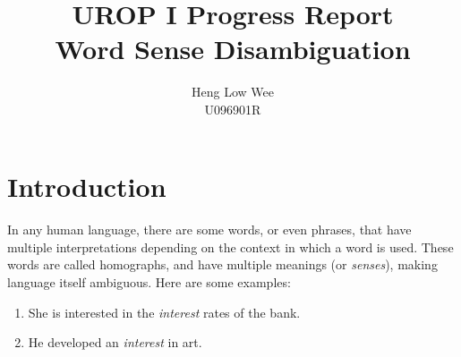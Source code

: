 \documentclass[12 pt]{article}
\begin{document}

\title{UROP I Progress Report \\ Word Sense Disambiguation}
\author{Heng Low Wee \\ U096901R}
\date{}
\maketitle

\section{Introduction}
\label{introduction}
\paragraph{}
In any human language, there are some words, or even phrases, that have multiple interpretations depending on the context in which a word is used. These words are called homographs, and have multiple meanings (or \textit{senses}), making language itself ambiguous. Here are some examples:
\begin{enumerate}
\item{She is interested in the \textit{interest} rates of the bank.}
\item{He developed an \textit{interest} in art.}
\end{enumerate}
\end{document}
